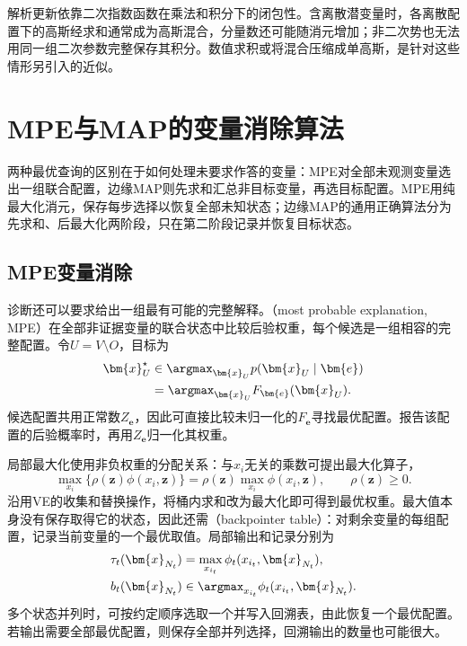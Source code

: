 解析更新依靠二次指数函数在乘法和积分下的闭包性。含离散潜变量时，各离散配置下的高斯经求和通常成为高斯混合，分量数还可能随消元增加；非二次势也无法用同一组二次参数完整保存其积分。数值求积或将混合压缩成单高斯，是针对这些情形另引入的近似。

\section{MPE与MAP的变量消除算法}
\label{sec:pgm-elimination-max-product}

两种最优查询的区别在于如何处理未要求作答的变量：MPE对全部未观测变量选出一组联合配置，边缘MAP则先求和汇总非目标变量，再选目标配置。MPE用纯最大化消元，保存每步选择以恢复全部未知状态；边缘MAP的通用正确算法分为先求和、后最大化两阶段，只在第二阶段记录并恢复目标状态。

\subsection{MPE变量消除}
\label{sec:pgm-elimination-mpe}

诊断还可以要求给出一组最有可能的完整解释。（most probable explanation, MPE）在全部非证据变量的联合状态中比较后验权重，每个候选是一组相容的完整配置。令$U=V\setminus O$，目标为
\begin{equation}
  \begin{aligned}
    \bm{x}_U^\star
    &\in\argmax_{\bm{x}_U}p(\bm{x}_U\mid\bm{e})\\
    &=\argmax_{\bm{x}_U}F_{\bm{e}}(\bm{x}_U).
  \end{aligned}
  \label{eq:pgm-elimination-mpe-objective}
\end{equation}
候选配置共用正常数$Z_{\bm{e}}$，因此可直接比较未归一化的$F_{\bm{e}}$寻找最优配置。报告该配置的后验概率时，再用$Z_{\bm{e}}$归一化其权重。

局部最大化使用非负权重的分配关系：与$x_i$无关的乘数可提出最大化算子，
\[
  \max_{x_i}\{\rho(\bm{z})\phi(x_i,\bm{z})\}
  =\rho(\bm{z})\max_{x_i}\phi(x_i,\bm{z}),
  \qquad \rho(\bm{z})\geq0.
\]
沿用VE的收集和替换操作，将桶内求和改为最大化即可得到最优权重。最大值本身没有保存取得它的状态，因此还需（backpointer table）：对剩余变量的每组配置，记录当前变量的一个最优取值。局部输出和记录分别为
\begin{equation}
  \begin{aligned}
    \tau_t(\bm{x}_{N_t})
      &=\max_{x_{i_t}}\phi_t(x_{i_t},\bm{x}_{N_t}),\\
    b_t(\bm{x}_{N_t})
      &\in\argmax_{x_{i_t}}\phi_t(x_{i_t},\bm{x}_{N_t}).
  \end{aligned}
  \label{eq:pgm-elimination-max-backpointer}
\end{equation}
多个状态并列时，可按约定顺序选取一个并写入回溯表，由此恢复一个最优配置。若输出需要全部最优配置，则保存全部并列选择，回溯输出的数量也可能很大。


